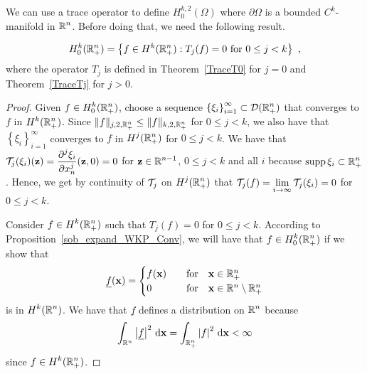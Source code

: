 
We can use a trace operator to define $\displaystyle H^{k,2}_0(\Omega)$ where
$\partial \Omega$ is a bounded $\displaystyle C^k$-manifold in
$\displaystyle \mathbb{R}^n$.  Before doing that, we need the following result.

\begin{prop} \label{H0Trace}
\[
H^{k}_0(\mathbb{R}^n_+) = \left\{ f \in H^{k}(\mathbb{R}^n_+) : T_j(f) = 0
\ \text{for} \ 0 \leq j < k \right\} \ ,
\]
where the operator $T_j$ is defined in Theorem~\ref{TraceT0} for $j=0$
and Theorem~\ref{TraceTj} for $j>0$.
\end{prop}

\begin{proof}
\subI{$\mathbf{\subset}$}
Given $\displaystyle f \in H^k_0(\mathbb{R}^n_+)$, choose a sequence
$\displaystyle \left\{\xi_i\right\}_{i=1}^\infty \subset \mathcal{D}(\mathbb{R}^n_+)$
that converges to $f$ in $\displaystyle H^k(\mathbb{R}^n_+)$.
Since $\|f\|_{j,2,\mathbb{R}^n_+} \leq \|f\|_{k,2,\mathbb{R}^n_+}$ for $0\leq j < k$,
we also have that $\displaystyle \left\{\xi_i\right\}_{i=1}^\infty$
converges to $f$ in $\displaystyle H^j(\mathbb{R}^n_+)$ for $0\leq j < k$.
We have that $\displaystyle \mathcal{T}_j(\xi_i)(\mathbf{z}) =
\frac{\displaystyle \partial^{j}{\xi_i}} {\displaystyle \partial x_n^{j}}(\mathbf{z},0) = 0$ for
$\displaystyle \mathbf{z} \in \mathbb{R}^{n-1}$, $0 \leq j < k$
and all $i$ because $\displaystyle \operatorname{supp} \xi_i \subset \mathbb{R}^n_+$.
Hence, we get by continuity of $\mathcal{T}_j$ on $\displaystyle H^j(\mathbb{R}^n_+)$
that $\displaystyle \mathcal{T}_j(f) = \lim_{i\to \infty} \mathcal{T}_j(\xi_i) = 0$
for $0 \leq j < k$.

\subI{$\mathbf{\supset}$}
Consider $\displaystyle f \in H^{k}(\mathbb{R}^n_+)$ such that
$T_j(f) = 0$ for $0 \leq j < k$.
According to Proposition~\ref{sob_expand_WKP_Conv}, we 
will have that $\displaystyle f \in H^{k}_0(\mathbb{R}^n_+)$ if we show that
\[
\underline{f}(\mathbf{x}) =
\begin{cases}
f(\mathbf{x}) & \quad \text{for} \quad \mathbf{x} \in \mathbb{R}^n_+ \\
0 & \quad \text{for} \quad \mathbf{x} \in \mathbb{R}^n \setminus \mathbb{R}^n_+ \\
\end{cases}
\]
is in $\displaystyle H^{k}(\mathbb{R}^n)$.  We have that $\underline{f}$
defines a distribution on $\displaystyle \mathbb{R}^n$ because
\[
\int_{\mathbb{R}^n} \left|\underline{f}\right|^2 \,\mathrm{d}{\mathbf{x}}
= \int_{\mathbb{R}^n_+} \left|f\right|^2 \,\mathrm{d}{\mathbf{x}} < \infty
\]
since $\displaystyle f \in H^k(\mathbb{R}^n_+)$.


\end{proof}
